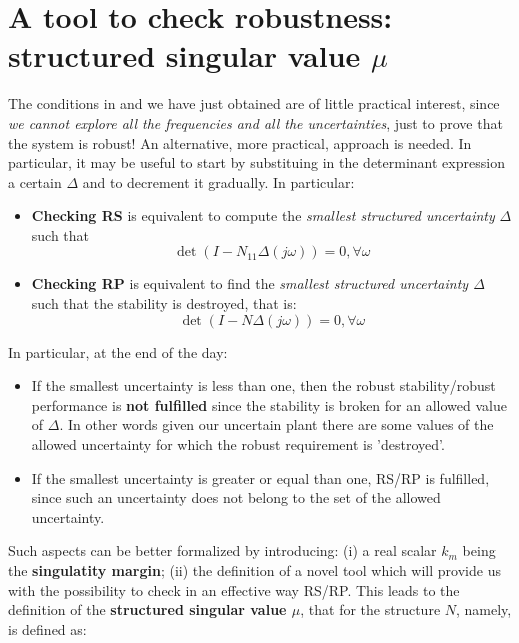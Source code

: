\documentclass[a4paper, 12pt]{article}
\begin{document}
\section{A tool to check robustness: structured singular value $\mu$}
The conditions in  and  we have just obtained are of little practical interest, since \textit{we cannot explore all the frequencies and all the uncertainties}, just to prove that the system is robust! An alternative, more practical, approach is needed. In particular, it may be useful to start by substituing in the determinant expression a certain $\Delta$ and to decrement it gradually. In particular: 
\begin{itemize}
    \itemsep-0.3em
    \item \textbf{Checking RS} is equivalent to compute the \textit{smallest structured uncertainty} $\Delta$ such that 
    \begin{equation}
        \det(I-N_{11}\Delta(j\omega))=0, \forall \omega
    \end{equation}
    \item \textbf{Checking RP} is equivalent to find the \textit{smallest structured uncertainty $\Delta$} such that the stability is destroyed, that is: 
    \begin{equation}
        \det(I-N\Delta(j\omega))=0, \forall \omega
    \end{equation}
\end{itemize}
In particular, at the end of the day:
\begin{itemize}
    \item If the smallest uncertainty is less than one, then the robust stability/robust performance is \textbf{not fulfilled} since the stability is broken for an allowed value of $\Delta$. In other words given our uncertain plant there are some values of the allowed uncertainty for which the robust requirement is 'destroyed'.
    \item If the smallest uncertainty is greater or equal than one, RS/RP is fulfilled, since such an uncertainty does not belong to the set of the allowed uncertainty.
\end{itemize}

\noindent
Such aspects can be better formalized by introducing: (i) a real scalar $k_m$ being the \textbf{singulatity margin}; (ii) the definition of a novel tool which will provide us with the possibility to check in an effective way RS/RP. This leads to the definition of the \textbf{structured singular value $\mu$}, that for the structure $N$, namely, is defined as:
\end{document}
